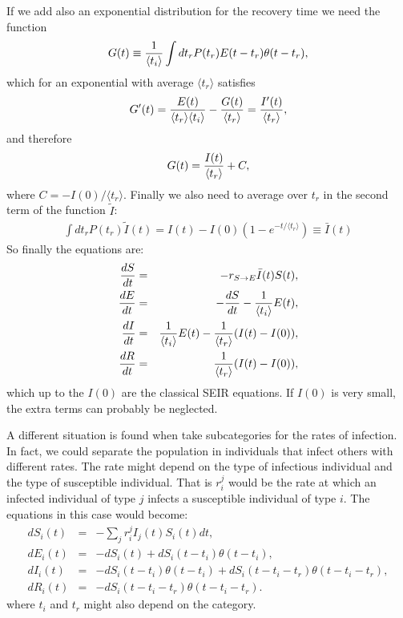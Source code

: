\documentclass[a4paper,oneside,11pt]{article}
\begin{document}
If we add also an exponential distribution for the recovery time we need the function
\begin{eqnarray}
G(t) \equiv {1\over \langle t_i\rangle } \int dt_r P(t_r) E(t-t_r) \theta(t-t_r), 
\end{eqnarray}
which for an exponential with average $\langle t_r\rangle$ satisfies
\begin{eqnarray}
G'(t) = {E(t)\over \langle t_r\rangle \langle t_i\rangle} - {G(t)\over  \langle t_r\rangle} = {I'(t)\over \langle t_r \rangle},
\end{eqnarray}
and therefore 
\begin{eqnarray}
G(t) = {I(t)\over \langle t_r \rangle} + C,
\end{eqnarray}
where $C= -I(0)/\langle t_r \rangle$.
Finally we also need to average over $t_r$ in the second term of the function $\tilde{I}$:
\begin{eqnarray}
\int d t_r P(t_r) \tilde{I}(t) = I(t) - I(0) \left(1- e^{-t/\langle t_r\rangle}  \right) \equiv \bar{I}(t)
\end{eqnarray}
 So finally the equations are:
\begin{eqnarray}
{d S\over dt} &=& - r_{S\rightarrow E} \bar{I}(t) S(t),\nonumber\\ 
{d E\over dt} &=& -{d S\over d t} -{1 \over \langle t_i\rangle} E(t) ,\nonumber\\
{d I\over dt} &=& {1 \over \langle t_i\rangle} E(t) - {1\over  \langle t_r \rangle} (I(t) -I(0)),\nonumber\\
{d R\over d t} &=&  {1\over  \langle t_r\rangle} (I(t)-I(0)),\nonumber\\
\label{eqs:seirexp}
\end{eqnarray}
which up to the $I(0)$ are the classical SEIR equations. If $I(0)$ is very small, the extra terms 
 can probably be neglected. 

A different situation is found when take subcategories for the rates of infection. In fact, we could separate the population in individuals that infect others with different rates. The rate might depend on the type of infectious individual and the type of susceptible individual. That is $r^{j}_{i}$ would be the rate at which an infected individual of type $j$ infects a susceptible
individual of type $i$. The equations in this case would become:
\begin{eqnarray}
d S_i(t) &=& - \sum_j r^j_{i}  I_j(t) S_i(t) dt, \nonumber\\
d E_i(t) &=& -d S_i(t) + d S_i(t-t_i) \theta(t-t_i) ,\nonumber\\
d I_i(t) &=& -d S_i(t-t_i) \theta(t-t_i)+ d S_i(t-t_i-t_r) \theta(t-t_i-t_r),\nonumber\\
d R_i(t) &=& - d S_i(t - t_i - t_r) \theta(t-t_i-t_r).\nonumber
\end{eqnarray}
where $t_i$ and $t_r$ might also depend on the category.
\end{document}
